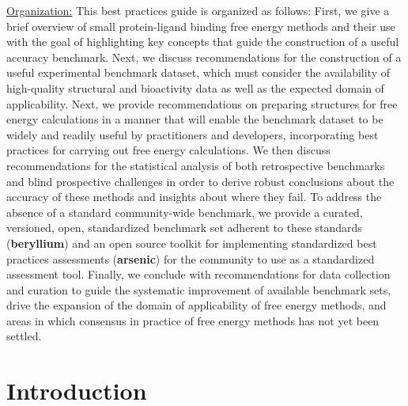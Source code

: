 \documentclass[9pt,bestpractices]{livecoms}
\begin{document}
\underline{Organization:} 
This best practices guide is organized as follows:
First, we give a brief overview of small protein-ligand binding free energy methods and their use with the goal of highlighting key concepts that guide the construction of a useful accuracy benchmark.
Next, we discuss recommendations for the construction of a useful experimental benchmark dataset, which must consider the availability of high-quality structural and bioactivity data as well as the expected domain of applicability.
Next, we provide recommendations on preparing structures for free energy calculations in a manner that will enable the benchmark dataset to be widely and readily useful by practitioners and developers, incorporating best practices for carrying out free energy calculations.
We then discuss recommendations for the statistical analysis of both retrospective benchmarks and blind prospective challenges in order to derive robust conclusions about the accuracy of these methods and insights about where they fail.
To address the absence of a standard community-wide benchmark, we provide a curated, versioned, open, standardized benchmark set adherent to these standards ({\bf beryllium}) and an open source toolkit for implementing standardized best practices assessments ({\bf arsenic}) for the community to use as a standardized assessment tool.
Finally, we conclude with recommendations for data collection and curation to guide the systematic improvement of available benchmark sets, drive the expansion of the domain of applicability of free energy methods, and areas in which consensus in practice of free energy methods has not yet been settled.

\section{Introduction}
\end{document}
